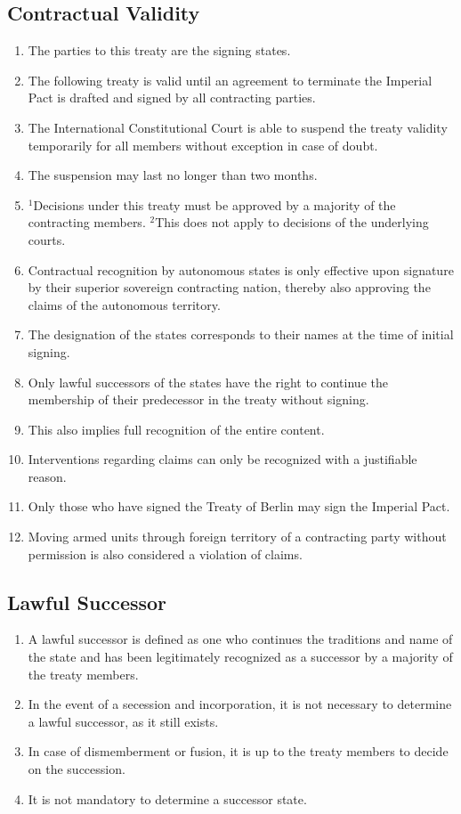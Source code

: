 \documentclass{article}
\begin{document}
\subsection{Contractual Validity}
\begin{enumerate}[(1)]
    \item The parties to this treaty are the signing states.
    \item The following treaty is valid until an agreement to terminate the Imperial Pact is drafted and signed by all contracting parties.
    \item The International Constitutional Court is able to suspend the treaty validity temporarily for all members without exception in case of doubt.
    \item The suspension may last no longer than two months.
    \item ${^1}$Decisions under this treaty must be approved by a majority of the contracting members. ${^2}$This does not apply to decisions of the underlying courts.
    \item Contractual recognition by autonomous states is only effective upon signature by their superior sovereign contracting nation, thereby also approving the claims of the autonomous territory.
    \item The designation of the states corresponds to their names at the time of initial signing.
    \item Only lawful successors of the states have the right to continue the membership of their predecessor in the treaty without signing.
    \item This also implies full recognition of the entire content.
    \item Interventions regarding claims can only be recognized with a justifiable reason.
    \item Only those who have signed the Treaty of Berlin may sign the Imperial Pact.
    \item Moving armed units through foreign territory of a contracting party without permission is also considered a violation of claims.
\end{enumerate}

\subsection{Lawful Successor}
\begin{enumerate}[(1)]
    \item A lawful successor is defined as one who continues the traditions and name of the state and has been legitimately recognized as a successor by a majority of the treaty members.
    \item In the event of a secession and incorporation, it is not necessary to determine a lawful successor, as it still exists.
    \item In case of dismemberment or fusion, it is up to the treaty members to decide on the succession.
    \item It is not mandatory to determine a successor state.
\end{enumerate}
\end{document}

